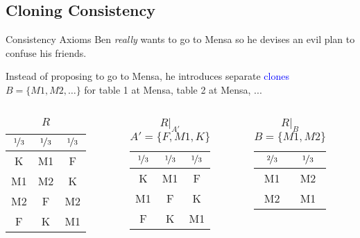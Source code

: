 \documentclass{beamer}
\theoremstyle{definition}
\def\b{\textcolor{blue}}
\begin{document}
\subsection{Cloning Consistency}

\begin{frame}{Consistency Axioms}
Ben \emph{really} wants to go to Mensa so he devises an evil plan to confuse his friends.\pause\par
Instead of proposing to go to Mensa, he introduces separate \b{clones} $B = \{M1, M2, \dots\}$ for table 1 at Mensa, table 2 at Mensa, ...\pause

\begin{columns}
\begin{column}{0.33\textwidth}
\begin{center}\begin{table}\begin{tabular}{ c|c|c } 
 $\nicefrac{1}{3}$ & $\nicefrac{1}{3}$ & $\nicefrac{1}{3}$ \\ 
 \hline\hline
 K & M1 & F \\ 
 M1 & M2 & K \\ 
 M2 & F & M2 \\ 
 F & K & M1 \\
\end{tabular}\caption{$R$}\end{table}\end{center}
\end{column}\pause
\begin{column}{0.33\textwidth}
\begin{center}\begin{table}\begin{tabular}{ c|c|c } 
 $\nicefrac{1}{3}$ & $\nicefrac{1}{3}$ & $\nicefrac{1}{3}$ \\ 
 \hline\hline
 K & M1 & F \\ 
 M1 & F & K \\ 
 F & K & M1 \\
\end{tabular}\caption{$R|_{A'}$ \\ $A' = \{F, M1, K\}$}\end{table}\end{center}
\end{column}
\begin{column}{0.33\textwidth}
\begin{center}\begin{table}\begin{tabular}{ c|c } 
 $\nicefrac{2}{3}$ & $\nicefrac{1}{3}$ \\ 
 \hline\hline
 M1 & M2 \\ 
 M2 & M1 \\ 
\end{tabular}\caption{$R|_B$ \\ $B = \{M1, M2\}$}\end{table}\end{center}
\end{column}
\end{columns}\pause


\end{frame}
\end{document}
